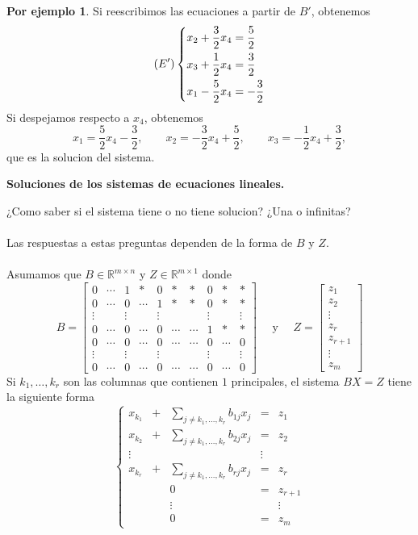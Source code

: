 \documentclass{article}
\theoremstyle{definition}
\theoremstyle{definition}
\newtheorem*{ej}{Por ejemplo}
\theoremstyle{remark}
\begin{document}
\begin{ej}
Si reescribimos las ecuaciones a partir de $B'$, obtenemos \[
  (E')\begin{dcases} x_2 + \frac{3}{2}x_4 = \frac{5}{2} \\x_3 + \frac{1}{2}x_4 = \frac{3}{2} \\ x_1 - \frac{5}{2}x_4 = -\frac{3}{2}  \end{dcases}\]
  Si despejamos respecto a $x_4$, obtenemos \[
    x_1=\frac{5}{2}x_4-\frac{3}{2}, \quad \quad x_2=-\frac{3}{2}x_4+\frac{5}{2}, \quad \quad x_3 = -\frac{1}{2}x_4 + \frac{3}{2}, 
  \] que es la solucion del sistema.
\end{ej}
\begin{center}
\textbf{Soluciones de los sistemas de ecuaciones lineales.}
\end{center}
¿Como saber si el sistema tiene o no tiene solucion? ¿Una o infinitas? \\\\
Las respuestas a estas preguntas dependen de la forma de $B$ y $Z$. \\\\ Asumamos que $B \in \mathbb{R}^{m \times n}$ y $Z \in \mathbb{R}^{m \times 1}$ donde \[
  B=\begin{bmatrix} 0 & \cdots & 1 & * & 0 & * & * & 0 & * & * \\ 0 & \cdots & 0 & \cdots & 1 & * & * & 0 & * & * \\ 
    \vdots & & \vdots & & \vdots & & & \vdots & & \vdots \\
    0 & \cdots & 0 & \cdots & 0 & \cdots & \cdots & 1 & * & * \\ 
    0 & \cdots & 0 & \cdots & 0 & \cdots & \cdots & 0 & \cdots & 0 \\
    \vdots & & \vdots & & \vdots & & & \vdots & & \vdots \\
    0 & \cdots & 0 & \cdots & 0 & \cdots  & \cdots & 0 & \cdots & 0 \end{bmatrix} 
    \quad \text{ y } \quad Z = \begin{bmatrix} z_1 \\ z_2 \\ \vdots \\ z_r \\ z_{r+1} \\ \vdots \\ z_m \end{bmatrix} 
\]
Si $k_1, \dots, k_r$ son las columnas que contienen $1$ principales, el sistema $BX=Z$ tiene la siguiente forma \[
  \left\{\begin{array}{ccccc} 
      x_{k_{1}} & + & \sum_{j\neq k_1, \dots, k_r} b_{1j}x_{j} & = & z_1 \\
      x_{k_{2}}& + & \sum_{j\neq k_1, \dots, k_r} b_{2j}x_{j} & = & z_2 \\
      \vdots & && \vdots  \\
      x_{k_{r}} & + & \sum_{j \neq k_1, \dots, k_r}b_{rj}x_{j} & = & z_r \\
              & & 0 & = & z_{r+1} \\
              &&\vdots &&\vdots \\
              &&0 & = & z_m
  \end{array}\right.
\]
\end{document}
